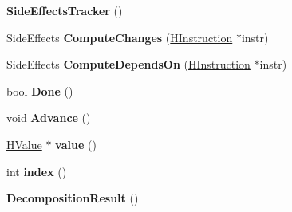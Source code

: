 \begin{DoxyCompactItemize}
\item 
\hypertarget{classv8_1_1internal_1_1_b_a_s_e___e_m_b_e_d_d_e_d_a5e8b58f4f19ec163ad1ac4769f68964c}{}{\bfseries Side\+Effects\+Tracker} ()\label{classv8_1_1internal_1_1_b_a_s_e___e_m_b_e_d_d_e_d_a5e8b58f4f19ec163ad1ac4769f68964c}

\item 
\hypertarget{classv8_1_1internal_1_1_b_a_s_e___e_m_b_e_d_d_e_d_a892a0092cb1d6982d7a4a14548a7c954}{}Side\+Effects {\bfseries Compute\+Changes} (\hyperlink{classv8_1_1internal_1_1_h_instruction}{H\+Instruction} $\ast$instr)\label{classv8_1_1internal_1_1_b_a_s_e___e_m_b_e_d_d_e_d_a892a0092cb1d6982d7a4a14548a7c954}

\item 
\hypertarget{classv8_1_1internal_1_1_b_a_s_e___e_m_b_e_d_d_e_d_ae6af9cfa8654a8111a91641920fc814f}{}Side\+Effects {\bfseries Compute\+Depends\+On} (\hyperlink{classv8_1_1internal_1_1_h_instruction}{H\+Instruction} $\ast$instr)\label{classv8_1_1internal_1_1_b_a_s_e___e_m_b_e_d_d_e_d_ae6af9cfa8654a8111a91641920fc814f}

\item 
\hypertarget{classv8_1_1internal_1_1_b_a_s_e___e_m_b_e_d_d_e_d_a7f0cde988076e056138a7a4b88b73023}{}bool {\bfseries Done} ()\label{classv8_1_1internal_1_1_b_a_s_e___e_m_b_e_d_d_e_d_a7f0cde988076e056138a7a4b88b73023}

\item 
\hypertarget{classv8_1_1internal_1_1_b_a_s_e___e_m_b_e_d_d_e_d_a4b06fdbbb29fc7d6641a995803b6d7ec}{}void {\bfseries Advance} ()\label{classv8_1_1internal_1_1_b_a_s_e___e_m_b_e_d_d_e_d_a4b06fdbbb29fc7d6641a995803b6d7ec}

\item 
\hypertarget{classv8_1_1internal_1_1_b_a_s_e___e_m_b_e_d_d_e_d_adcee0b929323785495892b771adcb8bd}{}\hyperlink{classv8_1_1internal_1_1_h_value}{H\+Value} $\ast$ {\bfseries value} ()\label{classv8_1_1internal_1_1_b_a_s_e___e_m_b_e_d_d_e_d_adcee0b929323785495892b771adcb8bd}

\item 
\hypertarget{classv8_1_1internal_1_1_b_a_s_e___e_m_b_e_d_d_e_d_a3d699c6dc9f1efc948ba49b5a1af850b}{}int {\bfseries index} ()\label{classv8_1_1internal_1_1_b_a_s_e___e_m_b_e_d_d_e_d_a3d699c6dc9f1efc948ba49b5a1af850b}

\item 
\hypertarget{classv8_1_1internal_1_1_b_a_s_e___e_m_b_e_d_d_e_d_a0d41b3f8d0c4135155c8922179486265}{}{\bfseries Decomposition\+Result} ()\label{classv8_1_1internal_1_1_b_a_s_e___e_m_b_e_d_d_e_d_a0d41b3f8d0c4135155c8922179486265}


\end{DoxyCompactItemize}

